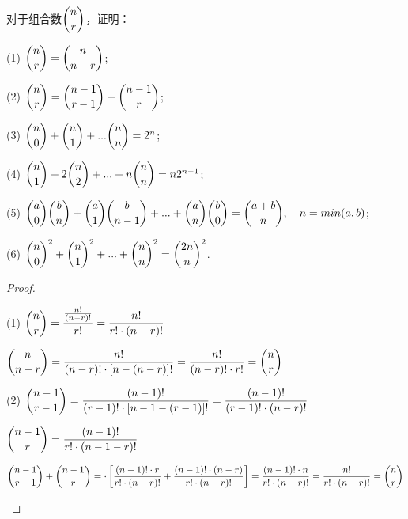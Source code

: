 \documentclass[lang=cn,newtx,10pt,scheme=chinese]{elegantbook}
\begin{document}
\begin{problemset}[习题 1.2]
    \item 对于组合数$\dbinom{n}{r}$，证明：\vspace{6pt}
    \item[(1)] $\dbinom{n}{r} = \dbinom{n}{n-r}$;\vspace{6pt}
    \item[(2)] $\dbinom{n}{r} = \dbinom{n-1}{r-1}+\dbinom{n-1}{r}$;\vspace{6pt}
    \item[(3)] $\dbinom{n}{0} + \dbinom{n}{1} + ... \dbinom{n}{n} = 2^n$;\vspace{6pt}
    \item[(4)] $\dbinom{n}{1} + 2\dbinom{n}{2} + ... + n\dbinom{n}{n} = n2^{n-1}$;\vspace{6pt}
    \item[(5)] $\dbinom{a}{0} \dbinom{b}{n} + \dbinom{a}{1} \dbinom{b}{n-1} + ... + \dbinom{a}{n} \dbinom{b}{0} = \dbinom{a+b}{n},\quad n=min(a,b)$;\vspace{6pt}
    \item[(6)] $\dbinom{n}{0}^2 + \dbinom{n}{1}^2 + ... + \dbinom{n}{n}^2 = \dbinom{2n}{n}^2$.\vspace{6pt}
    \vspace{6pt}
    \begin{proof}
        \begin{framed}
            \item[(1)] $\dbinom{n}{r} = \dfrac{\frac{n!}{(n-r)!}}{r!} = \dfrac{n!}{r! \cdot (n-r)!}$\vspace{6pt}\\
            \item[] $\dbinom{n}{n-r} = \dfrac{n!}{(n-r)! \cdot [n-(n-r)]!} = \dfrac{n!}{(n-r)! \cdot r!} = \dbinom{n}{r}$\vspace{6pt}
            \item[(2)] $\dbinom{n-1}{r-1}=\dfrac{(n-1)!}{(r-1)! \cdot [n-1-(r-1)]!}=\dfrac{(n-1)!}{(r-1)! \cdot (n-r)!}$\vspace{6pt}\\
            \item[] $\dbinom{n-1}{r}=\dfrac{(n-1)!}{r! \cdot (n-1-r)!}$\vspace{6pt}\\
            \item[] $\dbinom{n-1}{r-1}+\dbinom{n-1}{r}=\cdot \left[\dfrac{(n-1)! \cdot r}{r! \cdot (n-r)!}+\dfrac{(n-1)! \cdot (n-r)}{r! \cdot (n-r)!}\right]=\dfrac{(n-1)! \cdot n}{r! \cdot (n-r)!} = \dfrac{n!}{r! \cdot (n-r)!} =\dbinom{n}{r}$\vspace{6pt}

\end{framed}
\end{proof}
\end{problemset}
\end{document}
